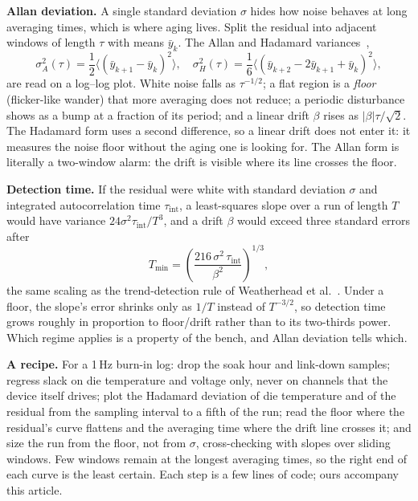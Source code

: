 \documentclass[10pt,twocolumn]{article}
\newcommand{\Tmin}{T_{\min}}
\newcommand{\tint}{\tau_{\mathrm{int}}}
\begin{document}
\textbf{Allan deviation.} A single standard deviation $\sigma$ hides how noise behaves at long averaging times, which is where aging lives. Split the residual into adjacent windows of length $\tau$ with means $\bar y_k$. The Allan and Hadamard variances~\cite{allan},
\begin{equation}
\sigma_A^2(\tau)=\frac{1}{2}\big\langle(\bar y_{k+1}-\bar y_k)^2\big\rangle,\quad
\sigma_H^2(\tau)=\frac{1}{6}\big\langle(\bar y_{k+2}-2\bar y_{k+1}+\bar y_k)^2\big\rangle,
\label{eq:allan}
\end{equation}
are read on a log--log plot. White noise falls as $\tau^{-1/2}$; a flat region is a \emph{floor} (flicker-like wander) that more averaging does not reduce; a periodic disturbance shows as a bump at a fraction of its period; and a linear drift $\beta$ rises as $|\beta|\tau/\sqrt2$. The Hadamard form uses a second difference, so a linear drift does not enter it: it measures the noise floor without the aging one is looking for. The Allan form is literally a two-window alarm: the drift is visible where its line crosses the floor.

\textbf{Detection time.} If the residual were white with standard deviation $\sigma$ and integrated autocorrelation time $\tint$, a least-squares slope over a run of length $T$ would have variance $24\sigma^2\tint/T^3$, and a drift $\beta$ would exceed three standard errors after
\begin{equation}
\Tmin=\left(\frac{216\,\sigma^2\,\tint}{\beta^2}\right)^{1/3},
\label{eq:tmin}
\end{equation}
the same scaling as the trend-detection rule of Weatherhead et al.~\cite{weatherhead}. Under a floor, the slope's error shrinks only as $1/T$ instead of $T^{-3/2}$, so detection time grows roughly in proportion to floor/drift rather than to its two-thirds power. Which regime applies is a property of the bench, and Allan deviation tells which.

\textbf{A recipe.} For a 1\,Hz burn-in log: drop the soak hour and link-down samples; regress slack on die temperature and voltage only, never on channels that the device itself drives; plot the Hadamard deviation of die temperature and of the residual from the sampling interval to a fifth of the run; read the floor where the residual's curve flattens and the averaging time where the drift line crosses it; and size the run from the floor, not from $\sigma$, cross-checking with slopes over sliding windows. Few windows remain at the longest averaging times, so the right end of each curve is the least certain. Each step is a few lines of code; ours accompany this article.
\end{document}
